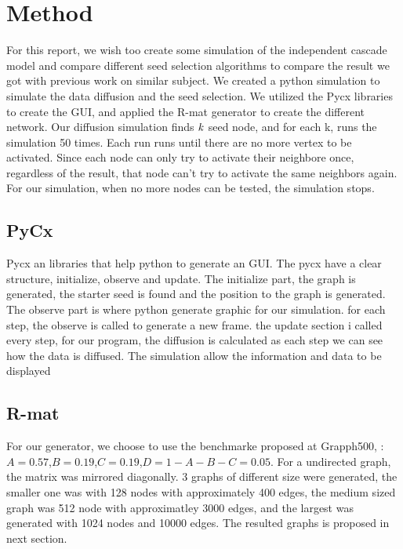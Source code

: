 \chapter{Method}
For this report, we wish too create some simulation of the independent cascade model and compare different seed selection algorithms to compare the result we got with previous work on similar subject\cite{MaximizeSpread2015}. We created a python simulation to simulate the data diffusion and the seed selection. We utilized the Pycx libraries to create the GUI, and applied the R-mat generator to create the different network. Our diffusion simulation finds $\it{k}$ seed node, and for each k, runs the simulation 50 times. Each run runs until there are no more vertex to be activated. Since each node can only try to activate their neighbore once, regardless of the result, that node can't try to activate the same neighbors again. For our simulation, when no more nodes can be tested, the simulation stops. 

\section{PyCx}
Pycx an libraries that help python to generate an GUI\cite{Pycx}. The pycx have a clear structure, initialize, observe and update. The initialize part, the graph is generated, the starter seed is found and the position to the graph is generated. The observe part is where python generate graphic for our simulation. for each step, the observe is called to generate a new frame. the update section i called every step, for our program, the diffusion is calculated as each step we can see how the data is diffused. The simulation allow the information and data to be displayed 


\section{R-mat}
For our generator, we choose to  use the benchmarke proposed at Grapph500, :$A=0.57$,$B=0.19$,$C=0.19$,$D = 1-A-B-C = 0.05$. For a undirected graph, the matrix was mirrored diagonally. 3 graphs of different size were generated, the smaller one was with 128 nodes with approximately 400 edges, the medium sized graph was 512 node with approximatley 3000 edges, and the largest was generated with 1024 nodes and 10000 edges. The resulted graphs is proposed in next section. 

